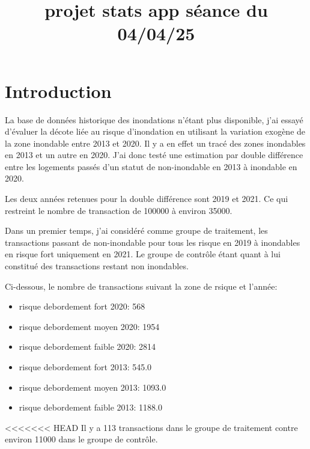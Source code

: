 \documentclass[a4paper,12pt]{article}
\begin{document}
\title{\textbf{projet stats app séance du 04/04/25}}
\maketitle


\section{Introduction}

La base de données historique des inondations n'étant plus disponible, j'ai essayé d'évaluer la décote liée au risque d'inondation en utilisant la variation exogène de la zone inondable entre 2013 et 2020. Il y a en effet un tracé des zones inondables en 2013 et un autre en 2020. J'ai donc testé une estimation par double différence entre les logements passés d'un statut de non-inondable en 2013 à inondable en 2020. \newline

Les deux années retenues pour la double différence sont 2019 et 2021. Ce qui restreint le nombre de transaction de 100000 à environ 35000. \newline

Dans un premier temps, j'ai considéré comme groupe de traitement, les transactions passant de non-inondable pour tous les risque en 2019 à inondables en risque fort uniquement en 2021. Le groupe de contrôle étant quant à lui constitué des transactions restant non inondables. \newline

Ci-dessous, le nombre de transactions suivant la zone de rsique et l'année: 
\begin{itemize}
\item risque debordement fort 2020: 568
\item risque debordement moyen 2020: 1954
\item risque debordement faible 2020: 2814
\item risque debordement fort 2013: 545.0
\item risque debordement moyen 2013: 1093.0
\item risque debordement faible 2013: 1188.0
\end{itemize}
<<<<<<< HEAD
\newline
Il y a 113 transactions dans le groupe de traitement contre environ 11000 dans le groupe de contrôle.\newline
\end{document}
